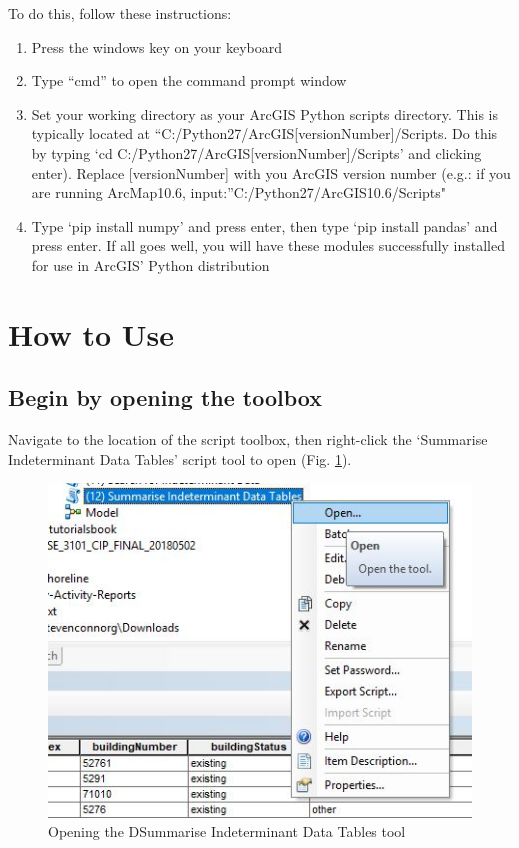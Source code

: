 \documentclass[openany]{book}
\providecommand{\tightlist}{%
  \setlength{\itemsep}{0pt}\setlength{\parskip}{0pt}}
\theoremstyle{definition}
\theoremstyle{definition}
\theoremstyle{definition}
\theoremstyle{remark}
\begin{document}
To do this, follow these instructions:

\begin{enumerate}
\def\labelenumi{\arabic{enumi}.}
\tightlist
\item
  Press the windows key on your keyboard
\item
  Type ``cmd'' to open the command prompt window
\item
  Set your working directory as your ArcGIS Python scripts directory.
  This is typically located at
  ``C:/Python27/ArcGIS{[}versionNumber{]}/Scripts. Do this by typing `cd
  C:/Python27/ArcGIS{[}versionNumber{]}/Scripts' and clicking enter).
  Replace {[}versionNumber{]} with you ArcGIS version number (e.g.: if
  you are running ArcMap10.6, input:''C:/Python27/ArcGIS10.6/Scripts"
\item
  Type `pip install numpy' and press enter, then type `pip install
  pandas' and press enter. If all goes well, you will have these modules
  successfully installed for use in ArcGIS' Python distribution
\end{enumerate}

\section{How to Use}\label{how-to-use-9}

\subsection{Begin by opening the
toolbox}\label{begin-by-opening-the-toolbox-9}

Navigate to the location of the script toolbox, then right-click the
`Summarise Indeterminant Data Tables' script tool to open (Fig.
\ref{fig:summIndtopen}).

\begin{figure}[H]

{\centering \includegraphics{figures/summIndt-open} 

}

\caption{Opening the DSummarise Indeterminant Data Tables tool}\label{fig:summIndtopen}
\end{figure}
\end{document}
